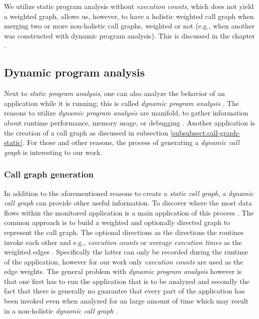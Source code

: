 \documentclass[12pt,a4paper]{report}
\begin{document}
We utilize static program analysis without \textit{execution counts}, which
does not yield a weighted graph, allows us, however, to have a holistic
weighted call graph when merging two or more non\hyp holistic call graphs,
weighted or not (e.g., when another was constructed with dynamic program analysis).
This is discussed in the chapter \textit{}.


\subsection{Dynamic program analysis} \label{subsect:background-dynamic-analysis}

Next to \textit{static program analysis}, one can also analyze the behavior of
an application while it is running; this is called \textit{dynamic program
analysis} \cite{ernst2003static}. The reasons to utilize \textit{dynamic
program analysis} are manifold, to gather information about runtime
performance, memory usage, or debugging \cite{ernst2003static}. Another
application is the creation of a call graph as discussed in subsection
\ref{subsubsect:call-graph-static}. For those and other reasons, the process
of generating a \textit{dynamic call graph} is interesting to our work.


\subsubsection{Call graph generation} \label{subsubsect:call-graph-dynamic}
In addition to the aforementioned reasons to create a \textit{static call
graph}, a \textit{dynamic call graph} can provide other useful information.
To discover where the most data flows within the monitored
application is a main application of this process \cite{graham1982gprof}. The
common approach is to build a weighted and optionally directed graph to
represent the call graph. The optional directions as the directions the
routines invoke each other and e.g., \textit{execution counts} or average
\textit{execution times} as the weighted edges \cite{graham1982gprof}.
Specifically the latter can only be recorded during the runtime of the
application, however for our work only \textit{execution counts} are used as
the edge weights. The general problem with \textit{dynamic program analysis}
however is that one first has to run the application that is to be analyzed and
secondly the fact that there is generally no guarantee that every part of
the application has been invoked even when analyzed for an large amount of
time which may result in a non\hyp holistic \textit{dynamic call graph}
\cite{graham1982gprof}.
\end{document}
